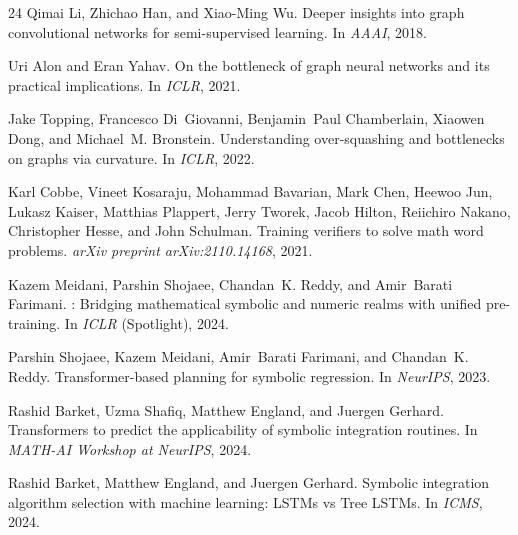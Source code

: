 \documentclass{article}
\begin{document}
\begin{thebibliography}{24}
	Qimai Li, Zhichao Han, and Xiao-Ming Wu.
	\newblock Deeper insights into graph convolutional networks for semi-supervised learning.
	\newblock In \emph{AAAI}, 2018.

	Uri Alon and Eran Yahav.
	\newblock On the bottleneck of graph neural networks and its practical implications.
	\newblock In \emph{ICLR}, 2021.

	Jake Topping, Francesco Di~Giovanni, Benjamin~Paul Chamberlain, Xiaowen Dong, and Michael~M. Bronstein.
	\newblock Understanding over-squashing and bottlenecks on graphs via curvature.
	\newblock In \emph{ICLR}, 2022.

	Karl Cobbe, Vineet Kosaraju, Mohammad Bavarian, Mark Chen, Heewoo Jun,
	Lukasz Kaiser, Matthias Plappert, Jerry Tworek, Jacob Hilton, Reiichiro Nakano,
	Christopher Hesse, and John Schulman.
	\newblock Training verifiers to solve math word problems.
	\newblock \emph{arXiv preprint arXiv:2110.14168}, 2021.

	Kazem Meidani, Parshin Shojaee, Chandan~K. Reddy, and
	Amir~Barati Farimani.
	: Bridging mathematical symbolic and numeric realms with
	unified pre-training.
	\newblock In \emph{ICLR} (Spotlight), 2024.

	Parshin Shojaee, Kazem Meidani, Amir~Barati Farimani, and
	Chandan~K. Reddy.
	\newblock Transformer-based planning for symbolic regression.
	\newblock In \emph{NeurIPS}, 2023.

	Rashid Barket, Uzma Shafiq, Matthew England, and Juergen Gerhard.
	\newblock Transformers to predict the applicability of symbolic integration
	routines.
	\newblock In \emph{MATH-AI Workshop at NeurIPS}, 2024.

	Rashid Barket, Matthew England, and Juergen Gerhard.
	\newblock Symbolic integration algorithm selection with machine learning:
	{LSTMs} vs {Tree LSTMs}.
	\newblock In \emph{ICMS}, 2024.

\end{thebibliography}


\end{document}
